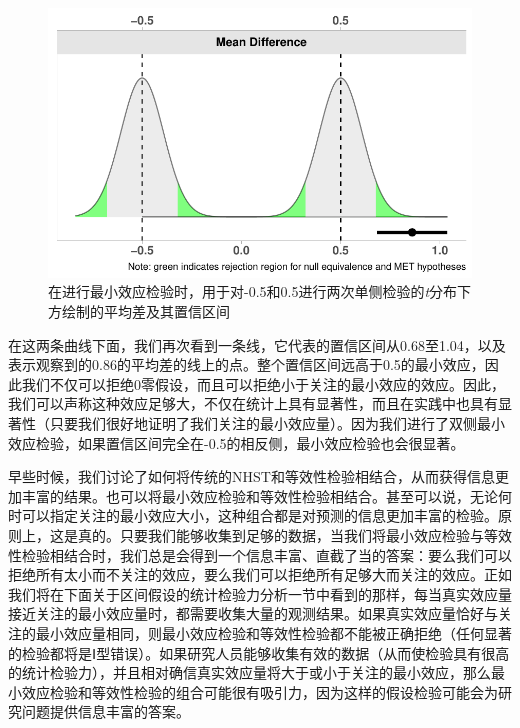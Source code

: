 \documentclass[
  letterpaper,
  DIV=11,
  numbers=noendperiod]{scrreprt}
\begin{document}
\begin{figure}

{\centering \includegraphics[width=1\textwidth,height=\textheight]{09-equivalencetest_files/figure-pdf/fig-tmet-1.pdf}

}

\caption{\label{fig-tmet}在进行最小效应检验时，用于对-0.5和0.5进行两次单侧检验的\emph{t}分布下方绘制的平均差及其置信区间}

\end{figure}

在这两条曲线下面，我们再次看到一条线，它代表的置信区间从0.68至1.04，以及表示观察到的0.86的平均差的线上的点。整个置信区间远高于0.5的最小效应，因此我们不仅可以拒绝0零假设，而且可以拒绝小于关注的最小效应的效应。因此，我们可以声称这种效应足够大，不仅在统计上具有显著性，而且在实践中也具有显著性（只要我们很好地证明了我们关注的最小效应量）。因为我们进行了双侧最小效应检验，如果置信区间完全在-0.5的相反侧，最小效应检验也会很显著。

早些时候，我们讨论了如何将传统的NHST和等效性检验相结合，从而获得信息更加丰富的结果。也可以将最小效应检验和等效性检验相结合。甚至可以说，无论何时可以指定关注的最小效应大小，这种组合都是对预测的信息更加丰富的检验。原则上，这是真的。只要我们能够收集到足够的数据，当我们将最小效应检验与等效性检验相结合时，我们总是会得到一个信息丰富、直截了当的答案：要么我们可以拒绝所有太小而不关注的效应，要么我们可以拒绝所有足够大而关注的效应。正如我们将在下面关于区间假设的统计检验力分析一节中看到的那样，每当真实效应量接近关注的最小效应量时，都需要收集大量的观测结果。如果真实效应量恰好与关注的最小效应量相同，则最小效应检验和等效性检验都不能被正确拒绝（任何显著的检验都将是Ⅰ型错误）。如果研究人员能够收集有效的数据（从而使检验具有很高的统计检验力），并且相对确信真实效应量将大于或小于关注的最小效应，那么最小效应检验和等效性检验的组合可能很有吸引力，因为这样的假设检验可能会为研究问题提供信息丰富的答案。
\end{document}
